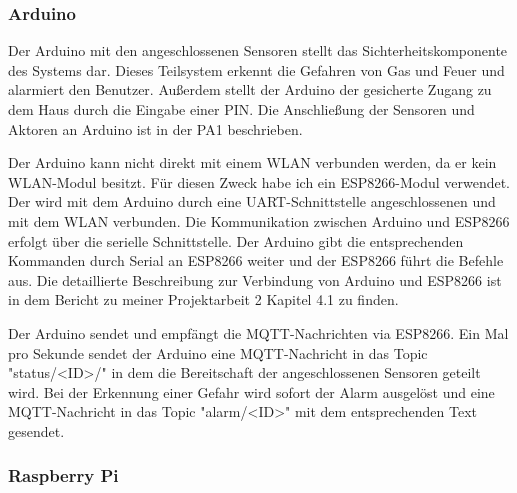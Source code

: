 \documentclass[12pt, letterpaper]{article}
\begin{document}
  \subsubsection{Arduino}
  \par Der Arduino mit den angeschlossenen Sensoren stellt das Sichterheitskomponente des Systems dar. Dieses Teilsystem erkennt die Gefahren von Gas und Feuer und alarmiert den Benutzer. Außerdem stellt der Arduino der gesicherte Zugang zu dem Haus durch die Eingabe einer PIN. Die Anschließung der Sensoren und Aktoren an Arduino ist in der PA1 \cite{pa1} beschrieben. 
  \par Der Arduino kann nicht direkt mit einem WLAN verbunden werden, da er kein WLAN-Modul besitzt. Für diesen Zweck habe ich ein ESP8266-Modul verwendet. Der wird mit dem Arduino durch eine UART-Schnittstelle angeschlossenen und mit dem WLAN verbunden. Die Kommunikation zwischen Arduino und ESP8266 erfolgt über die serielle Schnittstelle. Der Arduino gibt die entsprechenden Kommanden durch Serial an ESP8266 weiter und der ESP8266 führt die Befehle aus. Die detaillierte Beschreibung zur Verbindung von Arduino und ESP8266 ist in dem Bericht zu meiner Projektarbeit 2 \cite{pa2} Kapitel 4.1 zu finden.
  \par Der Arduino sendet und empfängt die MQTT-Nachrichten via ESP8266. Ein Mal pro Sekunde sendet der Arduino eine MQTT-Nachricht in das Topic "status/<ID>/" in dem die Bereitschaft der angeschlossenen Sensoren geteilt wird. Bei der Erkennung einer Gefahr wird sofort der Alarm ausgelöst und eine MQTT-Nachricht in das Topic "alarm/<ID>" mit dem entsprechenden Text gesendet.
  \subsubsection{Raspberry Pi}
\end{document}
